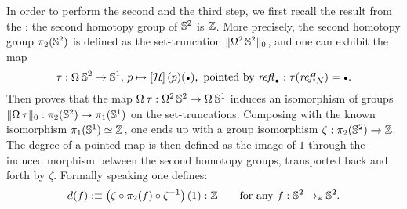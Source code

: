 \documentclass[english,a4]{article}
\renewcommand{\ap}[1]{\left[{#1}\right]}
\newcommand{\ptdto}{\to_\ast}%
\newcommand{\setTrunc}[1]{\Trunc{#1}_0}
\begin{document}
In order to perform the second and the third step, we first recall the result from the
\cite[Cor. 8.5.2]{HoTT}: the second homotopy group of ${{\mathbb S^{2}}}$ is $\mathbb{Z}$. More precisely, the
second homotopy group $\pi_2({{\mathbb S^{2}}})$ is defined as the set-truncation
$\setTrunc{\loopspace 2 \Sp}$, and one can exhibit the map
\begin{displaymath}
  \tau: \loopspace\null\Sp \to \Sc, \, p \mapsto \ap\hopf(p)(\base),
\text{ pointed by $\refl{\base}:\tau(\refl{N})=\base$}.
\end{displaymath}
Then \cite[Section 8.4 and 8.5]{HoTT} proves that the map $\loopspace\null\tau :
\loopspace 2 \Sp \to \loopspace \null \Sc$ induces an isomorphism of groups
$\setTrunc{\loopspace\null\tau}: \pi_2(\Sp) \to \pi_1(\Sc)$ on the set-truncations.
Composing with the known isomorphism $\pi_1({{\mathbb S^{1}}}) \simeq \mathbb{Z}$, one
ends up with a group isomorphism $\zeta: \pi_2({{\mathbb S^{2}}}) \to \mathbb{Z}$. The degree of a
pointed map is then defined as the image of $1$ through the induced morphism
between the second homotopy groups, transported back and forth by $\zeta$. 
Formally speaking one defines: 
\begin{displaymath}
  d(f) \defequi \left(\zeta\circ\pi_2(f)\circ \inv\zeta\right)(1):\ZZ \qquad
  \text{for any}\ f:\Sp\ptdto\Sp.
\end{displaymath}
\end{document}
